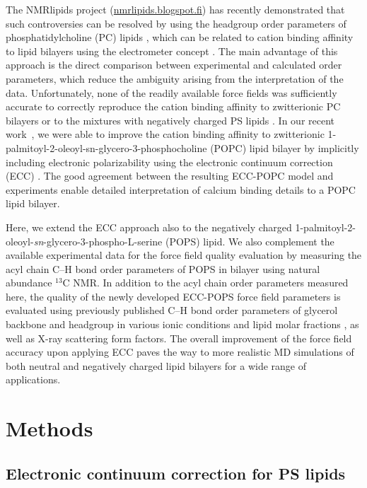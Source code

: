 \documentclass[journal=jctcce,manuscript=article]{achemso}
\begin{document}
The NMRlipids project (\url{nmrlipids.blogspot.fi}) has recently demonstrated
that such controversies can be resolved by using the headgroup order parameters
of phosphatidylcholine (PC) lipids \cite{catte16, NMRlipidsIV}, which can
be related to cation binding affinity to lipid bilayers using the electrometer
concept \cite{akutsu81,altenbach84,seelig87}. The main advantage of this approach
is the direct comparison between experimental and calculated order parameters,
which reduce the ambiguity arising from the interpretation of the data.
Unfortunately, none of the readily available force fields was sufficiently accurate to correctly reproduce the
cation binding affinity to zwitterionic PC bilayers \cite{catte16} or to the
mixtures with negatively charged PS lipids \cite{NMRlipidsIV}.
In our recent work~\cite{melcr18}, we were able to improve the cation binding affinity
to zwitterionic 1-palmitoyl-2-oleoyl-sn-glycero-3-phosphocholine (POPC) lipid bilayer
by implicitly including electronic polarizability using the electronic continuum
correction (ECC) \cite{leontyev09}. The good agreement between the resulting ECC-POPC
model and experiments enable detailed interpretation of calcium binding details to a POPC lipid bilayer.

Here, we extend the ECC approach also to the negatively charged 1-palmitoyl-2-oleoyl-{\it sn}-glycero-3-phospho-L-serine (POPS) lipid.
We also complement the available experimental data for the force field quality
evaluation by measuring the acyl chain C--H bond order parameters of POPS in bilayer using natural abundance $^{13}$C NMR.
In addition to the acyl chain order parameters measured here, the quality of the newly developed ECC-POPS force field parameters is
evaluated using previously published C--H bond order parameters of glycerol backbone and headgroup in various ionic
conditions and lipid molar fractions \cite{roux90,NMRlipidsIV}, as well as X-ray scattering form factors\cite{kucerka14}.
The overall improvement of the force field accuracy upon applying ECC
paves the way to more realistic MD simulations 
of both neutral and negatively charged lipid bilayers 
for a wide range of applications.

\section{Methods} 
 
\subsection{Electronic continuum correction for PS lipids}\label{section:ecc} 
\end{document}

